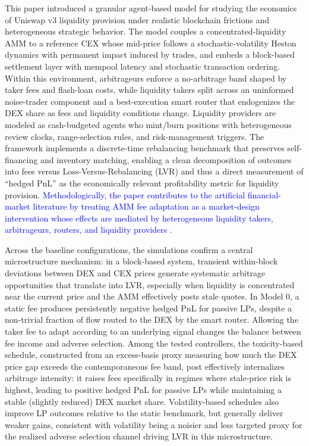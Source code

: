 \documentclass[11pt]{article}
\begin{document}
This paper introduced a granular agent-based model for studying the economics of Uniswap v3 liquidity provision under 
realistic blockchain frictions and heterogeneous strategic behavior. The model couples a concentrated-liquidity AMM to 
a reference CEX whose mid-price follows a stochastic-volatility Heston dynamics with permanent impact induced by trades, 
and embeds a block-based settlement layer with mempool latency and stochastic transaction ordering. Within this 
environment, arbitrageurs enforce a no-arbitrage band shaped by taker fees and flash-loan costs, while liquidity takers 
split across an uninformed noise-trader component and a best-execution smart router that endogenizes the DEX share as 
fees and liquidity conditions change. Liquidity providers are modeled as cash-budgeted agents who mint/burn positions 
with heterogeneous review clocks, range-selection rules, and risk-management triggers. The framework implements a 
discrete-time rebalancing benchmark that preserves self-financing and inventory matching, enabling a clean decomposition 
of outcomes into fees versus Loss-Versus-Rebalancing (LVR) and thus a direct measurement of “hedged PnL” as the 
economically relevant profitability metric for liquidity provision. \textcolor{blue}{Methodologically, the paper contributes to the artificial financial-market literature by treating AMM fee adaptation as a market-design intervention whose effects are mediated by heterogeneous liquidity takers, arbitrageurs, routers, and liquidity providers \cite{raberto2001,chakraborti2011,westerhoff2006,mizuta2020}.}

Across the baseline configurations, the simulations confirm a central microstructure mechanism: in a block-based system, 
transient within-block deviations between DEX and CEX prices generate systematic arbitrage opportunities that translate 
into LVR, especially when liquidity is concentrated near the current price and the AMM effectively posts stale quotes. 
In Model 0, a static fee produces persistently negative hedged PnL for passive LPs, despite a non-trivial fraction of 
flow routed to the DEX by the smart router. Allowing the taker fee to adapt according to an underlying signal changes 
the balance between fee income and adverse selection. Among the tested controllers, the toxicity-based schedule, 
constructed from an excess-basis proxy measuring how much the DEX price gap exceeds the contemporaneous fee band, post 
effectively internalizes arbitrage intensity: it raises fees specifically in regimes where stale-price risk is highest, 
leading to positive hedged PnL for passive LPs while maintaining a stable (slightly reduced) DEX market share. 
Volatility-based schedules also improve LP outcomes relative to the static benchmark, but generally deliver weaker 
gains, consistent with volatility being a noisier and less targeted proxy for the realized adverse selection channel 
driving LVR in this microstructure.
\end{document}
